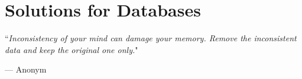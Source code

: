 \chapter{Solutions for Databases}
\label{ch:db}

``\textit{Inconsistency of your mind can damage your memory. Remove the inconsistent data and keep the original one only.}"

\begin{flushright}
    --- Anonym
\end{flushright}

\newpage





